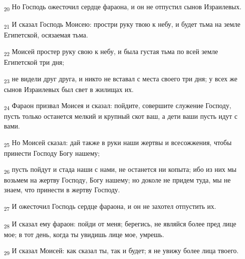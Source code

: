 \begin{tcolorbox}
\textsubscript{20} Но Господь ожесточил сердце фараона, и он не отпустил сынов Израилевых.
\end{tcolorbox}
\begin{tcolorbox}
\textsubscript{21} И сказал Господь Моисею: простри руку твою к небу, и будет тьма на земле Египетской, осязаемая тьма.
\end{tcolorbox}
\begin{tcolorbox}
\textsubscript{22} Моисей простер руку свою к небу, и была густая тьма по всей земле Египетской три дня;
\end{tcolorbox}
\begin{tcolorbox}
\textsubscript{23} не видели друг друга, и никто не вставал с места своего три дня; у всех же сынов Израилевых был свет в жилищах их.
\end{tcolorbox}
\begin{tcolorbox}
\textsubscript{24} Фараон призвал Моисея и сказал: пойдите, совершите служение Господу, пусть только останется мелкий и крупный скот ваш, а дети ваши пусть идут с вами.
\end{tcolorbox}
\begin{tcolorbox}
\textsubscript{25} Но Моисей сказал: дай также в руки наши жертвы и всесожжения, чтобы принести Господу Богу нашему;
\end{tcolorbox}
\begin{tcolorbox}
\textsubscript{26} пусть пойдут и стада наши с нами, не останется ни копыта; ибо из них мы возьмем на жертву Господу, Богу нашему; но доколе не придем туда, мы не знаем, что принести в жертву Господу.
\end{tcolorbox}
\begin{tcolorbox}
\textsubscript{27} И ожесточил Господь сердце фараона, и он не захотел отпустить их.
\end{tcolorbox}
\begin{tcolorbox}
\textsubscript{28} И сказал ему фараон: пойди от меня; берегись, не являйся более пред лице мое; в тот день, когда ты увидишь лице мое, умрешь.
\end{tcolorbox}
\begin{tcolorbox}
\textsubscript{29} И сказал Моисей: как сказал ты, так и будет; я не увижу более лица твоего.
\end{tcolorbox}
